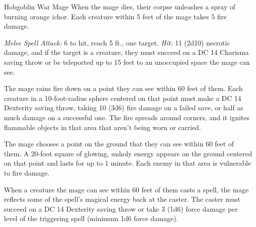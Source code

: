 \documentclass[10pt,a4paper,twoside,bg=print,twocolumn,openany,nodeprecatedcode]{dndbook}
\begin{document}
\begin{DndMonster}[float=t]{Hobgoblin War Mage}
\DndMonsterBasics[
armor-class = {15 (\textit{chain shirt})},
hit-points = {\DndDice{10d8 + 20}},
speed = {30 ft.}
]
\DndMonsterAbilityScores[
 str = 10,
 dex = 15,
 con = 15,
 int = 18,
 wis = 14,
 cha = 16
]
\DndMonsterDetails[
saving-throws = {Int +6, Cha +5},
skills = {Arcana +6, History +6},
damage-resistances = {fire},
senses = {darkvision 60 ft., passive perception 12},
languages = {Common, Goblin, Infernal},
challenge = 3,
]
When the mage dies, their corpse unleashes a spray of burning orange ichor. Each creature within 5 feet of the mage takes 5 fire damage.

\textsl{Melee Spell Attack:} 6 to hit, reach 5 ft., one target. \textsl{Hit:} 11 (2d10) necrotic damage, and if the target is a creature, they must succeed on a DC 14 Charisma saving throw or be teleported up to 15 feet to an unoccupied space the mage can see.

The mage rains fire down on a point they can see within 60 feet of them. Each creature in a 10-foot-radius sphere centered on that point must make a DC 14 Dexterity saving throw, taking 10 (3d6) fire damage on a failed save, or half as much damage on a successful one. The fire spreads around corners, and it ignites flammable objects in that area that aren't being worn or carried.

The mage chooses a point on the ground that they can see within 60 feet of them. A 20-foot square of glowing, unholy energy appears on the ground centered on that point and lasts for up to 1 minute. Each enemy in that area is vulnerable to fire damage.

When a creature the mage can see within 60 feet of them casts a spell, the mage reflects some of the spell's magical energy back at the caster. The caster must succeed on a DC 14 Dexterity saving throw or take 3 (1d6) force damage per level of the triggering spell (minimum 1d6 force damage).

\end{DndMonster}
\end{document}
